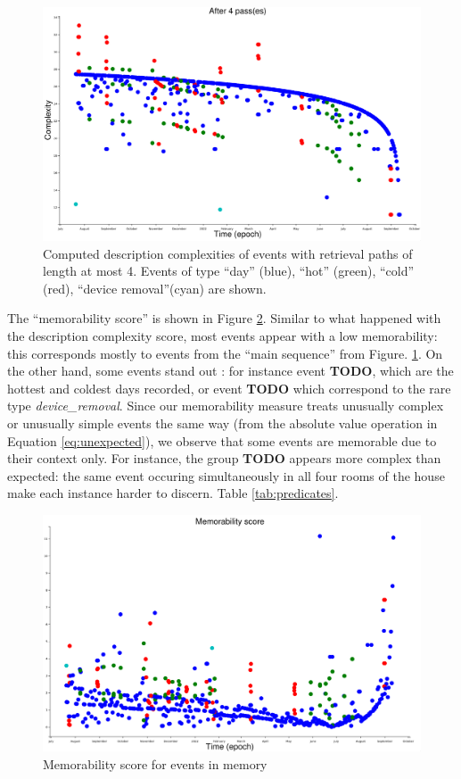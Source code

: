 \documentclass[entropy,article,submit,moreauthors,pdftex]{Definitions/mdpi}
\begin{document}
\begin{figure}[ht]
    \centering
\includegraphics[width=.8\linewidth]{figures/complexities_computed}
    \caption{Computed description complexities of events with retrieval paths of
length at most 4. Events of type ``day'' (blue), ``hot'' (green), ``cold''
(red), ``device removal''(cyan) are shown.}
    \label{fig:computed_cplx}
\end{figure}

The ``memorability score'' is shown in Figure \ref{fig:result1}. Similar to what happened with the description complexity score, most events appear with a low memorability: this corresponds mostly to events from the ``main sequence'' from Figure. \ref{fig:computed_cplx}. On the other hand, some events stand out : for instance event \textbf{TODO}, which are the hottest and coldest days recorded, or event \textbf{TODO} which correspond to the rare type \emph{device\_removal}.
Since our memorability measure treats unusually complex or unusually simple events the
same way (from the absolute value operation in Equation \ref{eq:unexpected}), we
observe that some events are memorable due to their context only. For instance,
the group \textbf{TODO} appears more complex than expected: the same event occuring simultaneously in all four rooms of the house make each instance harder to discern. Table \ref{tab:predicates}.

\begin{figure}[ht]
    \centering
\includegraphics[width=.8\linewidth]{figures/complexities_surprises}
    \caption{Memorability score for events in memory}
    \label{fig:result1}
\end{figure}
\end{document}
